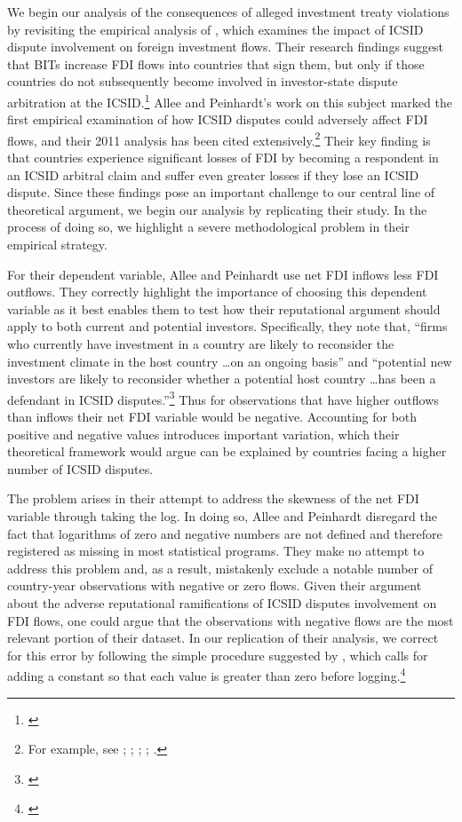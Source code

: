 \documentclass[12pt,onesided]{amsart}
\begin{document}
We begin our analysis of the consequences of alleged investment treaty violations by revisiting the empirical analysis of \citeauthor{allee:peinhardt:2011}, which examines the impact of ICSID dispute involvement on foreign investment flows. Their research findings suggest that BITs increase FDI flows into countries that sign them, but only if those countries do not subsequently become involved in investor-state dispute arbitration at the ICSID.\footnote{\citet{allee:peinhardt:2011}} Allee and Peinhardt's work on this subject marked the first empirical examination of how ICSID disputes could adversely affect FDI flows, and their 2011 analysis has been cited extensively.\footnote{For example, see \citet{berger2011more}; \citet{poulsen2013claim}; \citet{wellhausen2013}; \citet{haftel2013delayed}; \citet{kerner2014}.} Their key finding is that countries experience significant losses of FDI by becoming a respondent in an ICSID arbitral claim and suffer even greater losses if they lose an ICSID dispute. Since these findings pose an important challenge to our central line of theoretical argument, we begin our analysis by replicating their study. In the process of doing so, we highlight a severe methodological problem in their empirical strategy.

For their dependent variable, Allee and Peinhardt use net FDI inflows less FDI outflows. They correctly highlight the importance of choosing this dependent variable as it best enables them to test how their reputational argument should apply to both current and potential investors. Specifically, they note that, ``firms who currently have investment in a country are likely to reconsider the investment climate in the host country \ldots on an ongoing basis'' and ``potential new investors are likely to reconsider whether a potential host country \ldots has been a defendant in ICSID disputes.''\footnote{\citet[p. 419--420]{allee:peinhardt:2011}} Thus for observations that have higher outflows than inflows their net FDI variable would be negative. Accounting for both positive and negative values introduces important variation, which their theoretical framework would argue can be explained by countries facing a higher number of ICSID disputes. 

The problem arises in their attempt to address the skewness of the net FDI variable through taking the log. In doing so, Allee and Peinhardt disregard the fact that logarithms of zero and negative numbers are not defined and therefore registered as missing in most statistical programs. They make no attempt to address this problem and, as a result, mistakenly exclude a notable number of country-year observations with negative or zero flows. Given their argument about the adverse reputational ramifications of ICSID disputes involvement on FDI flows, one could argue that the observations with negative flows are the most relevant portion of their dataset. In our replication of their analysis, we correct for this error by following the simple procedure suggested by \citeauthor{li:2009}, which calls for adding a constant so that each value is greater than zero before logging.\footnote{\citet{li:2009}} 
\end{document}
